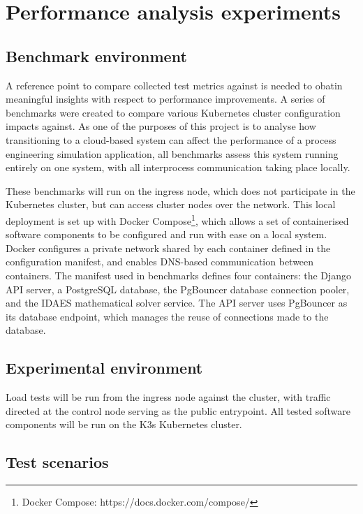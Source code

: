 \section{Performance analysis experiments}
\subsection{Benchmark environment}

A reference point to compare collected test metrics against is needed to obatin meaningful insights with respect to performance improvements. A series of benchmarks were created to compare various Kubernetes cluster configuration impacts against. As one of the purposes of this project is to analyse how transitioning to a cloud-based system can affect the performance of a process engineering simulation application, all benchmarks assess this system running entirely on one system, with all interprocess communication taking place locally.

These benchmarks will run on the ingress node, which does not participate in the Kubernetes cluster, but can access cluster nodes over the network. This local deployment is set up with Docker Compose\footnote{Docker Compose: https://docs.docker.com/compose/}, which allows a set of containerised software components to be configured and run with ease on a local system. Docker configures a private network shared by each container defined in the configuration manifest, and enables DNS-based communication between containers. The manifest used in benchmarks defines four containers: the Django API server, a PostgreSQL database, the PgBouncer database connection pooler, and the IDAES mathematical solver service. The API server uses PgBouncer as its database endpoint, which manages the reuse of connections made to the database. 

\subsection{Experimental environment}

Load tests will be run from the ingress node against the cluster, with traffic directed at the control node serving as the public entrypoint. All tested software components will be run on the K3s Kubernetes cluster.

\subsection{Test scenarios}

